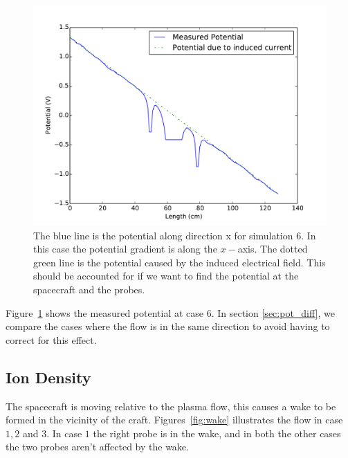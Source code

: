 	\begin{figure}
		\includegraphics[width = \textwidth]{images/emph}
		\caption{The blue line is the potential along direction x for simulation \(6\). In this case the potential gradient is along
		the \(x-\)axis. The dotted green line is the potential caused by the induced electrical field. This should be accounted for
		if  we want to find the potential at the spacecraft and the probes.}
		\label{fig:emph}
	\end{figure}

	Figure~\ref{fig:emph} shows the measured potential at case \(6\). In section \ref{sec:pot_diff},  we compare
	the cases where the flow is in the same direction to avoid having to correct for this effect.

\subsection{Ion Density}
		The spacecraft is moving relative to the plasma flow, this causes a wake to be formed in the vicinity of the craft.
	 	Figures~\ref{fig:wake} illustrates the flow in case \(1,2\) and \(3\). In case \(1\) the right probe is in the wake,
		and in both the other cases the two probes aren't affected by the wake.


